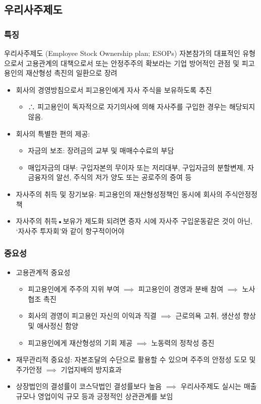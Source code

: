 \documentclass[aspectratio=169,xcolor=dvipsnames,handout]{beamer}
\begin{document}
\subsection{우리사주제도}%
\begin{frame}[allowframebreaks]
    \frametitle{특징}
\begin{block}{우리사주제도 (Employee Stock Ownership plan; ESOPs)}
    자본참가의 대표적인 유형으로서 고용관계의 대책으로서 또는 안정주주의 확보라는 기업 방어적인 관점 및 피고용인의 재산형성 촉진의 일환으로 장려
    \end{block}
    \begin{itemize}[<+->]
        \item 회사의 경영방침으로서 피고용인에게 자사 주식을 보유하도록 추진 
        \begin{itemize}[<+->]
            \item ∴ 피고용인이 독자적으로 자기의사에 의해 자사주를 구입한 경우는 해당되지 않음.
        \end{itemize}
        \item 회사의 특별한 편의 제공: 
        \begin{itemize}[<+->]
            \item 자금의 보조: 장려금의 교부 및 매매수수료의 부담
            \item 매입자금의 대부: 구입자본의 무이자 또는 저리대부, 구입자금의 분할변제, 자금융자의 알선, 주식의 저가 양도 또는 공로주의 증여 등
        \end{itemize}
        \item 자사주의 취득 및 장기보유: 피고용인의 재산형성정책인 동시에 회사의 주식안정정책
        \item 자사주의 취득•보유가 제도화 되려면 증자 시에 자사주 구입운동같은 것이 아닌, `자사주 투자회'와 같이 항구적이어야
    \end{itemize}
\end{frame}

\begin{frame}[allowframebreaks]
    \frametitle{중요성}
    \begin{itemize}[<+->]
        \item 고용관계적 중요성
        \begin{itemize}[<+->]
            \item 피고용인에게 주주의 지위 부여 $\implies$ 피고용인이 경영과 분배 참여 $\implies$ 노사협조 촉진
            \item 회사의 경영이 피고용인 자신의 이익과 직결 $\implies$ 근로의욕 고취, 생산성 향상 및 애사정신 함양
            \item 피고용인에게 재산형성의 기회 제공 $\implies$ 노동력의 정착성 증진
        \end{itemize}
        \item 재무관리적 중요성: 자본조달의 수단으로 활용할 수 있으며 주주의 안정성 도모 및 주가안정 $\implies$ 기업지배의 방지효과
        \item 상장법인의 결성률이 코스닥법인 결성률보다 높음 $\implies$ 우리사주제도 실시는 매출규모나 영업이익 규모 등과 긍정적인 상관관계를 보임
    \end{itemize}
\end{frame}
\end{document}
